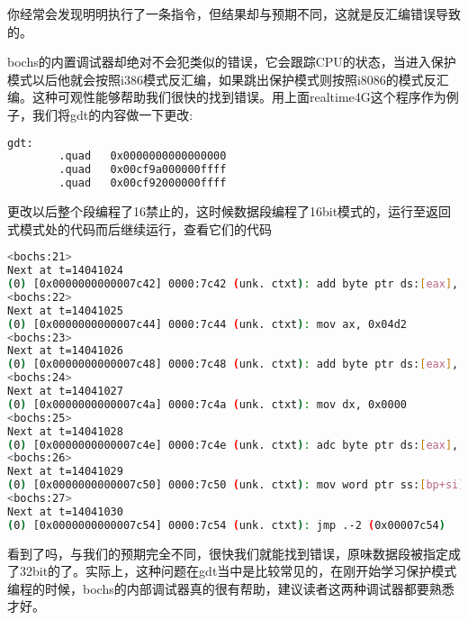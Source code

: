 你经常会发现明明执行了一条指令，但结果却与预期不同，这就是反汇编错误导致的。

bochs的内置调试器却绝对不会犯类似的错误，它会跟踪CPU的状态，当进入保护模式以后他就会按照i386模式反汇编，如果跳出保护模式则按照i8086的模式反汇编。这种可观性能够帮助我们很快的找到错误。用上面realtime4G这个程序作为例子，我们将gdt的内容做一下更改:
\begin{lstlisting}[language=bash]
gdt:
        .quad   0x0000000000000000
        .quad   0x00cf9a000000ffff
        .quad   0x00cf92000000ffff
\end{lstlisting}
更改以后整个段编程了16禁止的，这时候数据段编程了16bit模式的，运行至返回式模式处的代码而后继续运行，查看它们的代码

\begin{lstlisting}[language=bash]
<bochs:21>
Next at t=14041024
(0) [0x0000000000007c42] 0000:7c42 (unk. ctxt): add byte ptr ds:[eax], al ; 0000
<bochs:22>
Next at t=14041025
(0) [0x0000000000007c44] 0000:7c44 (unk. ctxt): mov ax, 0x04d2            ; 66b8d204
<bochs:23>
Next at t=14041026
(0) [0x0000000000007c48] 0000:7c48 (unk. ctxt): add byte ptr ds:[eax], al ; 0000
<bochs:24>
Next at t=14041027
(0) [0x0000000000007c4a] 0000:7c4a (unk. ctxt): mov dx, 0x0000            ; 66ba0000
<bochs:25>
Next at t=14041028
(0) [0x0000000000007c4e] 0000:7c4e (unk. ctxt): adc byte ptr ds:[eax], al ; 1000
<bochs:26>
Next at t=14041029
(0) [0x0000000000007c50] 0000:7c50 (unk. ctxt): mov word ptr ss:[bp+si], ax ; 67668902
<bochs:27>
Next at t=14041030
(0) [0x0000000000007c54] 0000:7c54 (unk. ctxt): jmp .-2 (0x00007c54)      ; ebfe
\end{lstlisting}
看到了吗，与我们的预期完全不同，很快我们就能找到错误，原味数据段被指定成了32bit的了。实际上，这种问题在gdt当中是比较常见的，在刚开始学习保护模式编程的时候，bochs的内部调试器真的很有帮助，建议读者这两种调试器都要熟悉才好。
